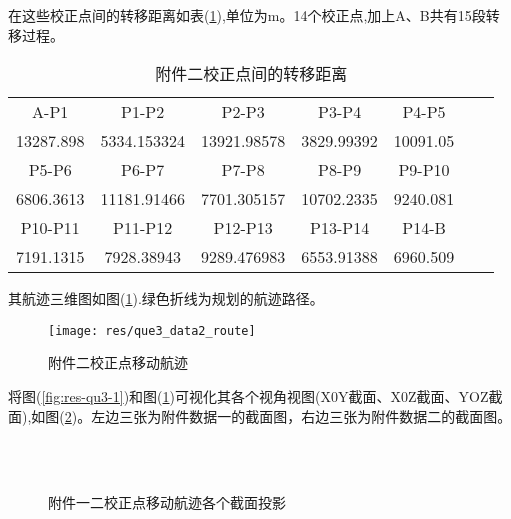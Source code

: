 在这些校正点间的转移距离如表(\ref{tab:qu3-2-dis}),单位为m。14个校正点,加上A、B共有15段转移过程。
\begin{table}[!htbp]
	\caption{附件二校正点间的转移距离} 
	\label{tab:qu3-2-dis}
	\centering
	\begin{tabular}{ccccccc} 
		\hline
        A-P1  & P1-P2 & P2-P3 & P3-P4 & P4-P5 \\ 
        13287.898 & 5334.153324 & 13921.98578 & 3829.99392 & 10091.05 \\
		\hline \hline
        P5-P6 & P6-P7 & P7-P8 & P8-P9 & P9-P10  \\ 
        6806.3613 & 11181.91466 & 7701.305157 & 10702.2335 & 9240.081 \\
        \hline \hline
        P10-P11 & P11-P12 & P12-P13 & P13-P14 & P14-B \\
        7191.1315 & 7928.38943 & 9289.476983 & 6553.91388 & 6960.509 \\
		\hline
\end{tabular}\end{table}

其航迹三维图如图(\ref{fig:res-qu3-2}).\figcolor 绿色折线为规划的航迹路径。
\begin{figure}[htbp!]
    \centering
    \texttt{[image: res/que3\_data2\_route]}
    \caption{附件二校正点移动航迹}
    \label{fig:res-qu3-2}
\end{figure}

将图(\ref{fig:res-qu3-1})和图(\ref{fig:res-qu3-2})可视化其各个视角视图(X0Y截面、X0Z截面、YOZ截面),如图(\ref{fig:res-qu3-2-add})。左边三张为附件数据一的截面图，右边三张为附件数据二的截面图。
\begin{figure}[!htbp]
	\centering
	 \quad
	 \\
     \quad
	 \\
     \quad
	\caption{附件一二校正点移动航迹各个截面投影}
	\label{fig:res-qu3-2-add}
\end{figure}



